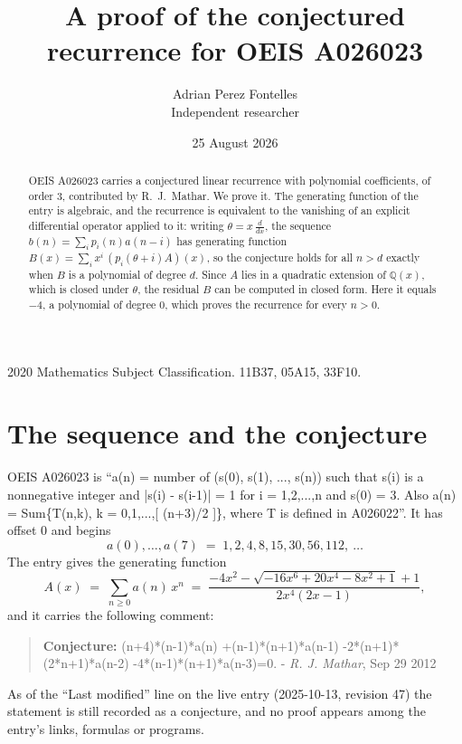 \documentclass[11pt,a4paper]{article}
\title{A proof of the conjectured recurrence for OEIS A026023}
\author{Adrian Perez Fontelles\\ \small Independent researcher}
\date{25 August 2026}
\theoremstyle{plain}
\theoremstyle{definition}
\begin{document}
\maketitle

\begin{abstract}
OEIS A026023 carries a conjectured linear recurrence with polynomial coefficients, of
order 3, contributed by R.~J.~Mathar. We prove it. The generating function of the
entry is algebraic, and the recurrence is equivalent to the vanishing of an explicit
differential operator applied to it: writing $\theta=x\,\frac{d}{dx}$, the sequence
$b(n)=\sum_{i}p_{i}(n)a(n-i)$ has generating function
$B(x)=\sum_{i}x^{i}\,(p_{i}(\theta+i)A)(x)$, so the conjecture holds for all $n>d$ exactly
when $B$ is a polynomial of degree $d$. Since $A$ lies in a quadratic extension of
$\mathbb{Q}(x)$, which is closed under $\theta$, the residual $B$ can be computed in
closed form. Here it equals $-4$, a polynomial of degree $0$, which proves
the recurrence for every $n>0$.
\end{abstract}

\noindent\small 2020 Mathematics Subject Classification. 11B37, 05A15, 33F10.\normalsize

\section{The sequence and the conjecture}

OEIS A026023 is ``a(n) = number of (s(0), s(1), ..., s(n)) such that s(i) is a nonnegative integer and |s(i) - s(i-1)| = 1 for i = 1,2,...,n and s(0) = 3. Also a(n) = Sum\{T(n,k), k = 0,1,...,[ (n+3)/2 ]\}, where T is defined in A026022''. It has offset $0$ and begins
\[
a(0),\dots,a(7)\;=\;1, 2, 4, 8, 15, 30, 56, 112,\ \dots
\]
The entry gives the generating function
\begin{equation}\label{eq:gf}
A(x)\;=\;\sum_{n\ge 0} a(n)\,x^{n}\;=\;\frac{- 4 x^{2} - \sqrt{- 16 x^{6} + 20 x^{4} - 8 x^{2} + 1} + 1}{2 x^{4} \left(2 x - 1\right)} ,
\end{equation}
and it carries the following comment:
\begin{quote}\small
\textbf{Conjecture:} (n+4)*(n-1)*a(n) +(n-1)*(n+1)*a(n-1) -2*(n+1)*(2*n+1)*a(n-2) -4*(n-1)*(n+1)*a(n-3)=0. - \emph{R. J. Mathar}, Sep 29 2012
\end{quote}
As of the ``Last modified'' line on the live entry (2025-10-13, revision 47) the
statement is still recorded as a conjecture, and no proof appears among the entry's links,
formulas or programs.
\end{document}

